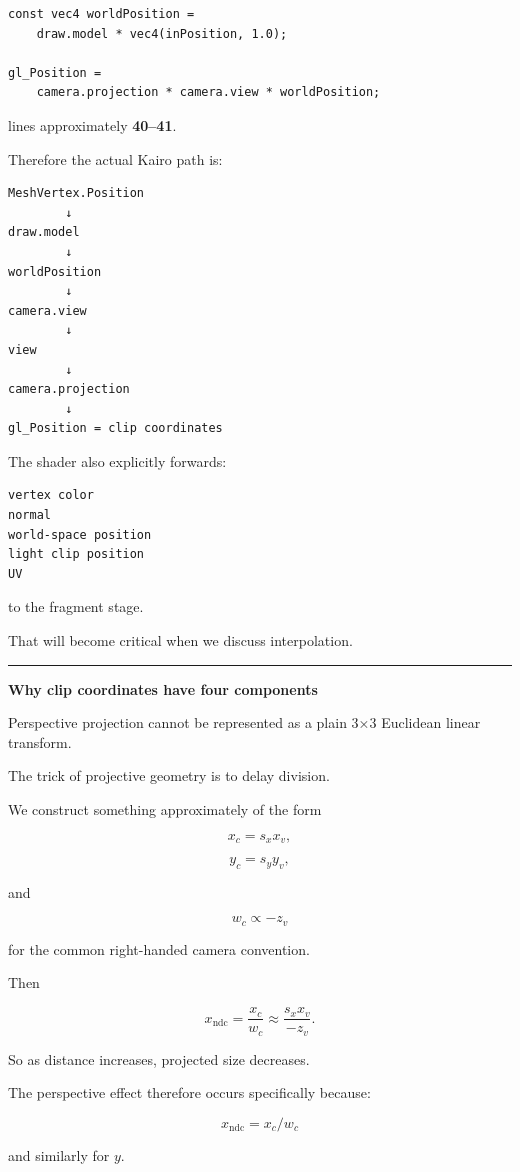 \begin{verbatim}
const vec4 worldPosition =
    draw.model * vec4(inPosition, 1.0);

gl_Position =
    camera.projection * camera.view * worldPosition;
\end{verbatim}

lines approximately \textbf{40--41}.

Therefore the actual Kairo path is:

\begin{verbatim}
MeshVertex.Position
        ↓
draw.model
        ↓
worldPosition
        ↓
camera.view
        ↓
view
        ↓
camera.projection
        ↓
gl_Position = clip coordinates
\end{verbatim}

The shader also explicitly forwards:

\begin{verbatim}
vertex color
normal
world-space position
light clip position
UV
\end{verbatim}

to the fragment stage.

That will become critical when we discuss interpolation.

\begin{center}\rule{0.5\linewidth}{0.5pt}\end{center}

\textbf{Why clip coordinates have four components}

Perspective projection cannot be represented as a plain 3×3 Euclidean linear transform.

The trick of projective geometry is to delay division.

We construct something approximately of the form

\[
x_c = s_xx_v,
\]

\[
y_c = s_yy_v,
\]

and

\[
w_c \propto -z_v
\]

for the common right-handed camera convention.

Then

\[
x_{\text{ndc}}
=
\frac{x_c}{w_c}
\approx
\frac{s_xx_v}{-z_v}.
\]

So as distance increases, projected size decreases.

The perspective effect therefore occurs specifically because:

\[
\boxed{x_{\text{ndc}} = x_c/w_c}
\]

and similarly for \(y\).

